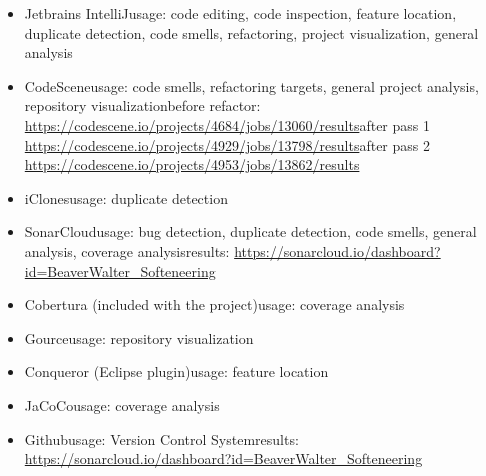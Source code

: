 \documentclass{article}
\begin{document}
\begin{itemize}
	\item Jetbrains IntelliJ\newline usage: code editing, code inspection, feature location, duplicate detection, code smells, refactoring, project visualization, general analysis
	\item CodeScene\newline usage: code smells, refactoring targets, general project analysis, repository visualization\newline before refactor: \url{https://codescene.io/projects/4684/jobs/13060/results}\newline after pass 1 \url{https://codescene.io/projects/4929/jobs/13798/results}\newline after pass 2 \url{https://codescene.io/projects/4953/jobs/13862/results}
	\item iClones\newline usage: duplicate detection
	\item SonarCloud\newline usage: bug detection, duplicate detection, code smells, general analysis, coverage analysis\newline results: \url{https://sonarcloud.io/dashboard?id=BeaverWalter_Softeneering}
	\item Cobertura (included with the project)\newline usage: coverage analysis
	\item Gource\newline usage: repository visualization
	\item Conqueror (Eclipse plugin)\newline usage: feature location
	\item JaCoCo\newline usage: coverage analysis
	\item Github\newline usage: Version Control System\newline results: \url{https://sonarcloud.io/dashboard?id=BeaverWalter_Softeneering}
\end{itemize}

\newpage

\end{document}
